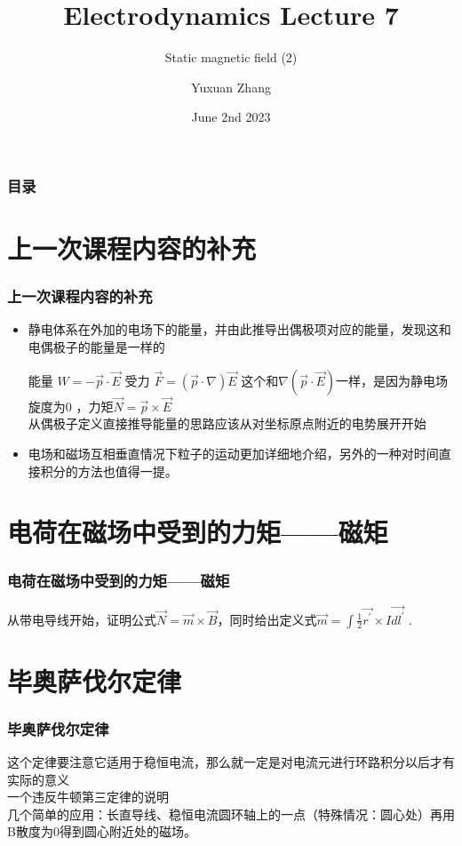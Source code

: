 \documentclass[10pt]{beamer}
\title[About Beamer] %
{Electrodynamics Lecture 7}
\subtitle{Static magnetic field (2)}
\author %
{Yuxuan Zhang }
\institute[VFU] %
{
  School of Physics \quad
  Zhejiang University
}
\date[VLC 2021] %
{June 2nd 2023}
\begin{document}
\frame{\titlepage}

\begin{frame}
    \frametitle{目录}
    \tableofcontents
\end{frame}

\section{上一次课程内容的补充}
\begin{frame}
    \frametitle{上一次课程内容的补充}
    \begin{itemize}
        \item 静电体系在外加的电场下的能量，并由此推导出偶极项对应的能量，发现这和电偶极子的能量是一样的
    
    能量 $W = -\vec{p} \cdot \vec{E}$ 受力 $\vec{F}=(\vec{p}\cdot\nabla)\vec{E}$ 这个和$\nabla(\vec{p}\cdot\vec{E})$一样，是因为静电场旋度为0 ，力矩$\vec{N} = \vec{p} \times \vec{E}$
    \\ 从偶极子定义直接推导能量的思路应该从对坐标原点附近的电势展开开始
    \item 电场和磁场互相垂直情况下粒子的运动更加详细地介绍，另外的一种对时间直接积分的方法也值得一提。
\end{itemize}
\end{frame}

\section{电荷在磁场中受到的力矩——磁矩}
\begin{frame}
    \frametitle{电荷在磁场中受到的力矩——磁矩}
    从带电导线开始，证明公式$\vec{N} = \vec{m} \times \vec{B}$，同时给出定义式$\vec{m} = \int \frac{1}{2}  \vec{r^\prime} \times I \vec{dl^\prime}$ .
\end{frame}

\section{毕奥萨伐尔定律}
\begin{frame}
    \frametitle{毕奥萨伐尔定律}
    这个定律要注意它适用于稳恒电流，那么就一定是对电流元进行环路积分以后才有实际的意义\\
    一个违反牛顿第三定律的说明\\
    几个简单的应用：长直导线、稳恒电流圆环轴上的一点（特殊情况：圆心处）再用B散度为0得到圆心附近处的磁场。
\end{frame}
\end{document}
